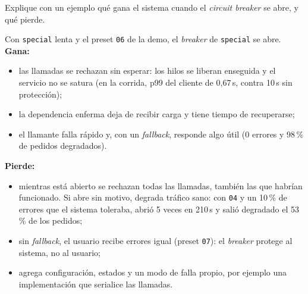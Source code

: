 \documentclass[variant=guia,cover=institutional,mode=screen]{ua-engineering-v6-article}
\begin{document}
\begin{uaexercise}
Explique con un ejemplo qué gana el sistema cuando el \emph{circuit breaker} se abre, y qué pierde.
\end{uaexercise}
\begin{uaanswer}
Con \texttt{special} lenta y el preset \texttt{06} de la demo, el \emph{breaker} de \texttt{special} se abre. \textbf{Gana:}
\begin{itemize}
\item las llamadas se rechazan sin esperar: los hilos se liberan enseguida y el servicio no se satura (en la corrida, p99 del cliente de 0,67\,s, contra 10\,s sin protección);
\item la dependencia enferma deja de recibir carga y tiene tiempo de recuperarse;
\item el llamante falla rápido y, con un \emph{fallback}, responde algo útil (0 errores y 98\,\% de pedidos degradados).
\end{itemize}
\textbf{Pierde:}
\begin{itemize}
\item mientras está abierto se rechazan todas las llamadas, también las que habrían funcionado. Si abre sin motivo, degrada tráfico sano: con \texttt{04} y un 10\,\% de errores que el sistema toleraba, abrió 5 veces en 210\,s y salió degradado el 53\,\% de los pedidos;
\item sin \emph{fallback}, el usuario recibe errores igual (preset \texttt{07}): el \emph{breaker} protege al sistema, no al usuario;
\item agrega configuración, estados y un modo de falla propio, por ejemplo una implementación que serialice las llamadas.
\end{itemize}
\end{uaanswer}
\end{document}
